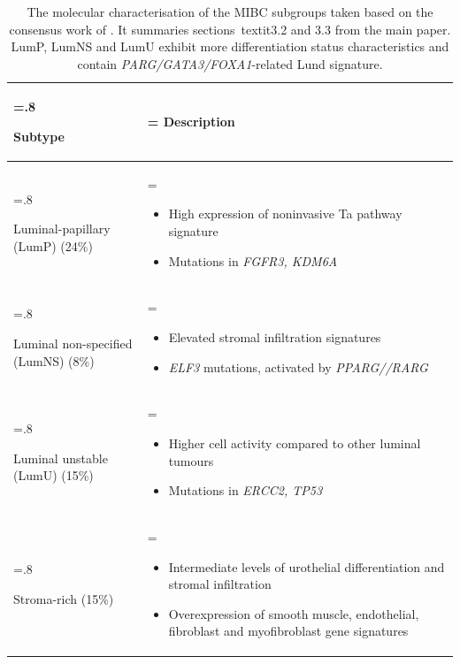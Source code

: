 \begin{appendices}
\begin{table}[!htb]
\centering
\caption{The molecular characterisation of the MIBC subgroups taken based on the consensus work of \cite{Kamoun2020-tj}. It summaries sections\  textit{3.2 and 3.3} from the main paper. LumP, LumNS and LumU exhibit more differentiation status characteristics and contain \textit{PARG/GATA3/FOXA1}-related Lund signature.}
    \begin{tabularx}{\textwidth}{>{\hsize=.8\hsize\raggedright\arraybackslash}X >{\hsize=\hsize\arraybackslash}X}
    \toprule
    Subtype & Description \\
    \midrule
    Luminal-papillary (LumP) (24\%) & 
    \begin{itemize}[leftmargin=*, nosep, after=\vspace{-\baselineskip}]
        \item High expression of noninvasive Ta pathway signature
        \item Mutations in \textit{FGFR3, KDM6A}
    \end{itemize} \\
    \midrule
    Luminal non-specified (LumNS) (8\%) & 
    \begin{itemize}[leftmargin=*, nosep, after=\vspace{-\baselineskip}]
        \item Elevated stromal infiltration signatures
        \item \textit{ELF3} mutations, activated by \textit{PPARG//RARG}
    \end{itemize} \\
    \midrule
    Luminal unstable (LumU) (15\%) & 
    \begin{itemize}[leftmargin=*, nosep, after=\vspace{-\baselineskip}]
        \item Higher cell activity compared to other luminal tumours
        \item Mutations in \textit{ERCC2, TP53}
    \end{itemize} \\
    \midrule
    Stroma-rich (15\%) & 
    \begin{itemize}[leftmargin=*, nosep, after=\vspace{-\baselineskip}]
        \item Intermediate levels of urothelial differentiation and stromal infiltration
        \item Overexpression of smooth muscle, endothelial, fibroblast and myofibroblast gene signatures

\end{itemize}
\end{tabularx}
\end{table}
\end{appendices}
